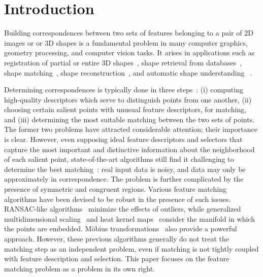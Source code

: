 \section{Introduction}
\label{sec:introduction}

Building correspondences between two sets of features belonging to a pair of 2D images or or 3D shapes
is a fundamental problem in many computer graphics, geometry processing, and computer vision tasks.
It arises in applications such as
registration of partial or entire 3D shapes~\cite{Besl92,Gelfand05,Aiger08,li08,Chang09,Zeng10,vanKaick11,Chang11},
shape retrieval from databases~\cite{Bronstein11},
shape matching~\cite{Berg05,Brown07,Lorenzo08,Tevs09,Ovsjanikov10,Tevs11,SahilliogluY11,Windheuser11},
shape reconstruction~\cite{Brown07,Pekelny08,Wand09,Chang11},
and automatic shape understanding~\cite{Huttenlocher90,Lipman09,Sun10,Kim11} .

Determining correspondences is typically done in three steps~\cite{Johnson99,Lowe04,Sun09,Toler10,Leutenegger11}:
(i) computing high-quality descriptors which serve to distinguish points from one another,
(ii) choosing certain salient points with unusual feature descriptors, for matching,
and (iii) determining the most suitable matching between the two sets of points.
The former two problems have attracted considerable attention; their importance is clear.
However, even supposing ideal feature descriptors and selectors that capture the most important and distinctive information about the neighborhood of each salient point,
state-of-the-art algorithms  still find it challenging to determine the best matching~\cite{vanKaick11}:  real input data is noisy, and data may only be approximately in correspondence. The problem is further complicated by the presence of symmetric and congruent regions.
Various feature matching algorithms have been devised to be robust in the presence of such issues. RANSAC-like algorithms~\cite{Tevs09,Tevs11}  minimize the effects of outliers,
while generalized multidimensional scaling~\cite{Bronstein11} and
heat kernel maps~\cite{Ovsjanikov10}  consider the manifold in which the points are embedded. M{\"o}bius transformations~\cite{Lipman09,Kim11} also provide a powerful approach.
However, these previous algorithms generally do not treat the matching step as an independent problem, even if matching is not tightly coupled with feature description and selection.
This paper focuses on the feature matching problem as a problem in its own right.

